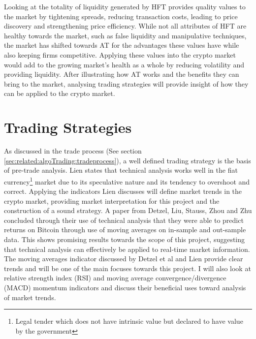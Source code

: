 Looking at the totality of liquidity generated by HFT provides quality values to the market by tightening spreads, reducing transaction costs, leading to price discovery and strengthening price efficiency. While not all attributes of HFT are healthy towards the market, such as false liquidity and manipulative techniques, the market has shifted towards AT for the advantages these values have while also keeping firms competitive. Applying these values into the crypto market would add to the growing market's health as a whole by reducing volatility and providing liquidity. After illustrating how AT works and the benefits they can bring to the market, analysing trading strategies will provide insight of how they can be applied to the crypto market.




\section{Trading Strategies}
\label{sec:related:tradingStrategies}
\noindent As discussed in the trade process (See section \ref{sec:related:algoTrading:tradeprocess}), a well defined trading strategy is the basis of pre-trade analysis. Lien \cite{BOOK:Lien:2016} states that technical analysis works well in the fiat currency\footnote{Legal tender which does not have intrinsic value but declared to have value by the government} market due to its speculative nature and its tendency to overshoot and correct. Applying the indicators Lien discusses will define market trends in the crypto market, providing market interpretation for this project and the construction of a sound strategy. A paper from Detzel, Liu, Stauss, Zhou and Zhu \cite{ART:DetzelEtAl:2018} concluded through their use of technical analysis that they were able to predict returns on Bitcoin through use of moving averages on in-sample and out-sample data. This shows promising results towards the scope of this project, suggesting that technical analysis can effectively be applied to real-time market information. The moving averages indicator discussed by Detzel et al \cite{ART:DetzelEtAl:2018} and Lien \cite{BOOK:Lien:2016} provide clear trends and will be one of the main focuses towards this project. I will also look at relative strength index (RSI) and moving average convergence/divergence (MACD) momentum indicators and discuss their beneficial uses toward analysis of market trends.

